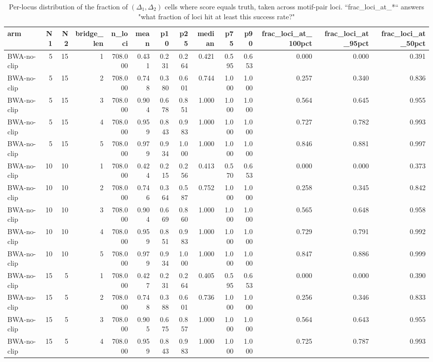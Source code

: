 \begin{table}
\caption{Per-locus distribution of the fraction of $(\Delta_1, \Delta_2)$ cells where score equals truth, taken across motif-pair loci.  ``frac\_loci\_at\_*`` answers "what fraction of loci hit at least this success rate?"}
\label{tab:compound-per-locus-distribution}
\begin{tabular}{lrrrrrrrrrrrrr}
\toprule
arm & N1 & N2 & bridge_len & n_loci & mean & p10 & p25 & median & p75 & p90 & frac_loci_at_100pct & frac_loci_at_95pct & frac_loci_at_50pct \\
\midrule
BWA-no-clip & 5 & 15 & 1 & 708.000 & 0.431 & 0.231 & 0.264 & 0.421 & 0.595 & 0.653 & 0.000 & 0.000 & 0.391 \\
BWA-no-clip & 5 & 15 & 2 & 708.000 & 0.748 & 0.380 & 0.601 & 0.744 & 1.000 & 1.000 & 0.257 & 0.340 & 0.836 \\
BWA-no-clip & 5 & 15 & 3 & 708.000 & 0.904 & 0.678 & 0.851 & 1.000 & 1.000 & 1.000 & 0.564 & 0.645 & 0.955 \\
BWA-no-clip & 5 & 15 & 4 & 708.000 & 0.959 & 0.843 & 0.983 & 1.000 & 1.000 & 1.000 & 0.727 & 0.782 & 0.993 \\
BWA-no-clip & 5 & 15 & 5 & 708.000 & 0.979 & 0.934 & 1.000 & 1.000 & 1.000 & 1.000 & 0.846 & 0.881 & 0.997 \\
BWA-no-clip & 10 & 10 & 1 & 708.000 & 0.424 & 0.215 & 0.256 & 0.413 & 0.570 & 0.653 & 0.000 & 0.000 & 0.373 \\
BWA-no-clip & 10 & 10 & 2 & 708.000 & 0.746 & 0.364 & 0.587 & 0.752 & 1.000 & 1.000 & 0.258 & 0.345 & 0.842 \\
BWA-no-clip & 10 & 10 & 3 & 708.000 & 0.904 & 0.669 & 0.860 & 1.000 & 1.000 & 1.000 & 0.565 & 0.648 & 0.958 \\
BWA-no-clip & 10 & 10 & 4 & 708.000 & 0.959 & 0.851 & 0.983 & 1.000 & 1.000 & 1.000 & 0.729 & 0.791 & 0.992 \\
BWA-no-clip & 10 & 10 & 5 & 708.000 & 0.979 & 0.934 & 1.000 & 1.000 & 1.000 & 1.000 & 0.847 & 0.886 & 0.999 \\
BWA-no-clip & 15 & 5 & 1 & 708.000 & 0.427 & 0.231 & 0.264 & 0.405 & 0.595 & 0.653 & 0.000 & 0.000 & 0.390 \\
BWA-no-clip & 15 & 5 & 2 & 708.000 & 0.748 & 0.388 & 0.601 & 0.736 & 1.000 & 1.000 & 0.256 & 0.346 & 0.833 \\
BWA-no-clip & 15 & 5 & 3 & 708.000 & 0.905 & 0.675 & 0.857 & 1.000 & 1.000 & 1.000 & 0.564 & 0.643 & 0.955 \\
BWA-no-clip & 15 & 5 & 4 & 708.000 & 0.959 & 0.843 & 0.983 & 1.000 & 1.000 & 1.000 & 0.725 & 0.787 & 0.993 \\

\end{tabular}
\end{table}
